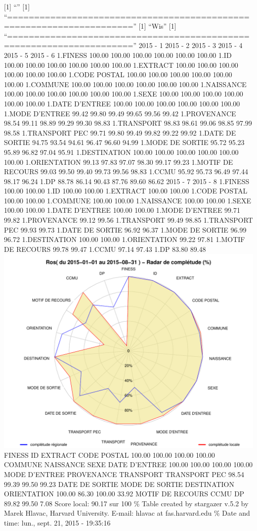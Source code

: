 \documentclass[]{article}
\begin{document}
{[}1{]} ``'' {[}1{]}
``=====================================================================''
{[}1{]} ``Wis'' {[}1{]}
``=====================================================================''
2015 - 1 2015 - 2 2015 - 3 2015 - 4 2015 - 5 2015 - 6 1.FINESS 100.00
100.00 100.00 100.00 100.00 100.00 1.ID 100.00 100.00 100.00 100.00
100.00 100.00 1.EXTRACT 100.00 100.00 100.00 100.00 100.00 100.00 1.CODE
POSTAL 100.00 100.00 100.00 100.00 100.00 100.00 1.COMMUNE 100.00 100.00
100.00 100.00 100.00 100.00 1.NAISSANCE 100.00 100.00 100.00 100.00
100.00 100.00 1.SEXE 100.00 100.00 100.00 100.00 100.00 100.00 1.DATE
D'ENTREE 100.00 100.00 100.00 100.00 100.00 100.00 1.MODE D'ENTREE 99.42
99.80 99.49 99.65 99.56 99.42 1.PROVENANCE 98.54 99.11 98.89 99.29 99.30
98.83 1.TRANSPORT 98.83 98.61 99.06 98.85 97.99 98.58 1.TRANSPORT PEC
99.71 99.80 99.49 99.82 99.22 99.92 1.DATE DE SORTIE 94.75 93.54 94.61
96.47 96.60 94.99 1.MODE DE SORTIE 95.72 95.23 95.89 96.82 97.04 95.91
1.DESTINATION 100.00 100.00 100.00 100.00 100.00 100.00 1.ORIENTATION
99.13 97.83 97.07 98.30 99.17 99.23 1.MOTIF DE RECOURS 99.03 99.50 99.40
99.73 99.56 98.83 1.CCMU 95.92 95.73 96.49 97.44 98.17 96.24 1.DP 88.78
86.14 90.43 87.76 89.60 86.62 2015 - 7 2015 - 8 1.FINESS 100.00 100.00
1.ID 100.00 100.00 1.EXTRACT 100.00 100.00 1.CODE POSTAL 100.00 100.00
1.COMMUNE 100.00 100.00 1.NAISSANCE 100.00 100.00 1.SEXE 100.00 100.00
1.DATE D'ENTREE 100.00 100.00 1.MODE D'ENTREE 99.71 99.82 1.PROVENANCE
99.12 99.56 1.TRANSPORT 99.49 98.85 1.TRANSPORT PEC 99.93 99.73 1.DATE
DE SORTIE 96.92 96.37 1.MODE DE SORTIE 96.99 96.72 1.DESTINATION 100.00
100.00 1.ORIENTATION 99.22 97.81 1.MOTIF DE RECOURS 99.78 99.47 1.CCMU
97.14 97.43 1.DP 83.80 89.48
\includegraphics{completude_files/figure-latex/finess-11.pdf} FINESS ID
EXTRACT CODE POSTAL 100.00 100.00 100.00 100.00 COMMUNE NAISSANCE SEXE
DATE D'ENTREE 100.00 100.00 100.00 100.00 MODE D'ENTREE PROVENANCE
TRANSPORT TRANSPORT PEC 98.54 99.39 99.50 99.23 DATE DE SORTIE MODE DE
SORTIE DESTINATION ORIENTATION 100.00 86.30 100.00 33.92 MOTIF DE
RECOURS CCMU DP 89.82 99.50 7.08 Score local: 90.17 sur 100 \% Table
created by stargazer v.5.2 by Marek Hlavac, Harvard University. E-mail:
hlavac at fas.harvard.edu \% Date and time: lun., sept. 21, 2015 -
19:35:16
\end{document}

